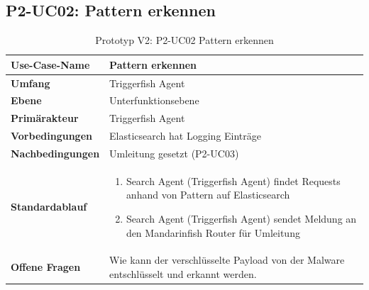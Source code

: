 \begin{table}[H]
\subsection{P2-UC02: Pattern erkennen}
    \centering
    \begin{tabularx}{\textwidth}{| l | p{} |}
        \hline
        \textbf{Use-Case-Name}     & \textbf{Pattern erkennen}    \\ \hline
        \textbf{Umfang}  & Triggerfish Agent     \\ \hline
        \textbf{Ebene} & Unterfunktionsebene   \\ \hline
        \textbf{Primärakteur} & Triggerfish Agent \\ \hline
        \textbf{Vorbedingungen} & Elasticsearch hat Logging Einträge \\ \hline
        \textbf{Nachbedingungen} & Umleitung gesetzt (P2-UC03) \\ \hline
        \textbf{Standardablauf} & \begin{enumerate}
        	\item Search Agent (Triggerfish Agent) findet Requests anhand von Pattern auf Elasticsearch
        	\item Search Agent (Triggerfish Agent) sendet Meldung an den Mandarinfish Router für Umleitung
        \end{enumerate} \\ \hline
        \textbf{Offene Fragen} & Wie kann der verschlüsselte Payload von der Malware entschlüsselt und erkannt werden. \\ \hline
    \end{tabularx}
    \caption{Prototyp V2: P2-UC02 Pattern erkennen}
\end{table}


